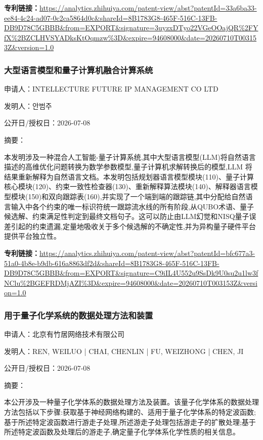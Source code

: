 \documentclass[12pt,a4paper]{ctexart}
\begin{document}
\noindent\textbf{专利链接：}\url{https://analytics.zhihuiya.com/patent-view/abst?patentId=33a6ba33-ee84-4c24-ad07-0c2ca5864d0c&shareId=8B1783G8-465F-516C-13FB-DB9D78C5GBBB&from=EXPORT&signature=3uyzxDTyo22VGeOOajQR%2FYfX%2BZCLHVSYADksKtOqmzw%3D&expire=94608000&date=20260710T003153Z&version=1.0}

\subsubsection{ 大型语言模型和量子计算机融合计算系统 }

申请人：INTELLECTURE FUTURE IP MANAGEMENT CO LTD

发明人：안범주

公开日/授权日：2026-07-08

摘要：

本发明涉及一种混合人工智能-量子计算系统,其中大型语言模型(LLM)将自然语言描述的高维优化问题转换为数学参数模型,量子计算机求解转换后的模型,LLM 将结果重新解释为自然语言文档。本发明包括规划器语言模型模块(110)、量子计算核心模块(120)、约束一致性检查器(130)、重新解释算法模块(140)、解释器语言模型模块(150)和双向跟踪表(160),并实现了一个端到端的跟踪链,其中分配给自然语言输入中各个约束的唯一标识符统一跟踪流水线的所有阶段,从QUBO术语、量子候选解、约束满足性判定到最终文档句子。这可以防止由LLM幻觉和NISQ量子误差引起的约束遗漏,定量地吸收关于多个候选解的不确定性,并为异构量子硬件平台提供平台独立性。

\noindent\textbf{专利链接：}\url{https://analytics.zhihuiya.com/patent-view/abst?patentId=bfc677a3-51a0-4b8e-b9db-616a8863df2d&shareId=8B1783G8-465F-516C-13FB-DB9D78C5GBBB&from=EXPORT&signature=C9iIL4U552u9SsDk9U0su2u1lw3fNClu%2BGEFRDMjAZI%3D&expire=94608000&date=20260710T003153Z&version=1.0}

\subsubsection{ 用于量子化学系统的数据处理方法和装置 }

申请人：北京有竹居网络技术有限公司

发明人：REN, WEILUO | CHAI, CHENLIN | FU, WEIZHONG | CHEN, JI

公开日/授权日：2026-07-08

摘要：

本公开涉及一种量子化学体系的数据处理方法及装置。该量子化学体系的数据处理方法包括以下步骤:获取基于神经网络构建的、适用于量子化学体系的特定波函数;基于所述特定波函数进行游走子处理,所述游走子处理包括游走子的扩散处理;基于所述特定波函数及处理后的游走子,确定量子化学体系化学性质的相关信息。
\end{document}
